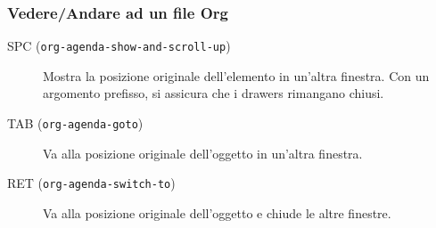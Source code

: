 \documentclass[11pt]{article}
\begin{document}
\subsubsection*{Vedere/Andare ad un file Org}
\label{sec:org4c2a0db}
\begin{description}
\item[{SPC (\texttt{org-agenda-show-and-scroll-up})}] Mostra la posizione originale dell'elemento in un'altra
finestra. Con un argomento prefisso, si assicura che i drawers
rimangano chiusi.

\item[{TAB (\texttt{org-agenda-goto})}] Va alla posizione originale dell'oggetto in un'altra finestra.

\item[{RET (\texttt{org-agenda-switch-to})}] Va alla posizione originale dell'oggetto e chiude le altre finestre.
\end{description}
\end{document}
